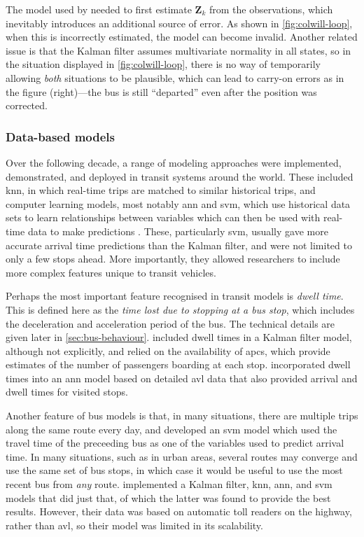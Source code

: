 \documentclass[12pt,a4paper]{article}
\newcommand{\mat}[1]{\mathbf{#1}}
\newcommand{\kf}{Kalman filter}
\begin{document}
The model used by \cite{cathey-dailey:2003} needed to first
estimate $\mat{Z}_k$ from the observations,
which inevitably introduces an additional source of error.
As shown in \vref{fig:colwill-loop}, when this is incorrectly estimated,
the model can become invalid.
Another related issue is that the \kf{} assumes multivariate normality
in all states, so in the situation displayed in \cref{fig:colwill-loop},
there is no way of temporarily allowing \emph{both} situations to be plausible,
which can lead to carry-on errors as in the figure (right)---the bus is still ``departed''
even after the position was corrected.



\subsubsection{Data-based models}
\label{sec:data-models}

Over the following decade, a range of modeling approaches were implemented, demonstrated,
and deployed in transit systems around the world.
These included \gls{knn}, in which real-time trips are matched to similar historical trips,
and computer learning models, most notably \gls{ann} and \gls{svm},
which use historical data sets to learn relationships between variables
which can then be used with real-time data to make predictions
\citep{park-rilett:1999,jeong-rilett:2005,yu-etal:2006,yu-etal:2010,yu-etal:2011}.
These, particularly \gls{svm}, usually gave more accurate arrival time
predictions than the \kf{}, and were not limited to only a few stops ahead.
More importantly, they allowed researchers to include more complex features
unique to transit vehicles.


Perhaps the most important feature recognised in transit models is \emph{dwell time}.
This is defined here as the \emph{time lost due to stopping at a bus stop},
which includes the deceleration and acceleration period of the bus.
The technical details are given later in \cref{sec:bus-behaviour}.
\cite{shalaby-farhan:2004} included dwell times in a \kf{} model,
although not explicitly,
and relied on the availability of \glspl{apc},
which provide estimates of the number of passengers boarding at each stop.
\cite{jeong-rilett:2005}
incorporated dwell times into an \gls{ann} model based on detailed \gls{avl} data
that also provided arrival and dwell times for visited stops.


Another feature of bus models is that, in many situations,
there are multiple trips along the same route every day,
and \cite{yu-etal:2006} developed an \gls{svm} model which used the travel time
of the preceeding bus as one of the variables used to predict arrival time.
In many situations, such as in urban areas,
several routes may converge and use the same set of bus stops,
in which case it would be useful to use the most recent bus from \emph{any} route.
\cite{yu-etal:2011} implemented a \kf{}, \gls{knn}, \gls{ann}, and \gls{svm} models that did just that,
of which the latter was found to provide the best results.
However, their data was based on automatic toll readers on the highway,
rather than \gls{avl},
so their model was limited in its scalability.
\end{document}
